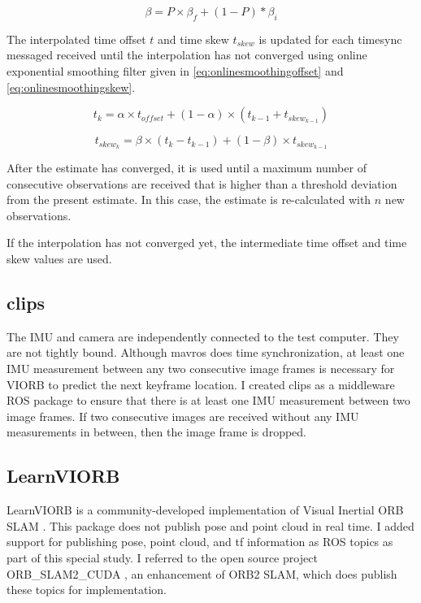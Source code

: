 \begin{equation} \label{eq:sigmoidbeta}
\beta = P \times \beta_f + (1 - P) * \beta_i
\end{equation}

The interpolated time offset $t$ and time skew $t_{skew}$ is updated for each timesync messaged received until the interpolation has not converged using online exponential smoothing filter given in \ref{eq:onlinesmoothingoffset} and \ref{eq:onlinesmoothingskew}.

\begin{equation} \label{eq:onlinesmoothingoffset}
t_{k} = \alpha \times t_{offset}  + (1 - \alpha) \times (t_{k-1} + t_{skew_{k-1}})
\end{equation}

\begin{equation} \label{eq:onlinesmoothingskew}
t_{skew_k} = \beta \times (t_k - t_{k-1}) + (1 - \beta) \times t_{skew_{k-1}} 
\end{equation}

After the estimate has converged, it is used until a maximum number of consecutive observations are received that is higher than a threshold deviation from the present estimate. In this case, the estimate is re-calculated with $n$ new observations.

If the interpolation has not converged yet, the intermediate time offset and time skew values are used.


\subsection{clips}
The IMU and camera are independently connected to the test computer. They are not tightly bound. Although mavros does time synchronization, at least one IMU measurement between any two consecutive image frames is necessary for VIORB to predict the next keyframe location. 
I created clips as a middleware ROS package to ensure that there is at least one IMU measurement between two image frames. If two consecutive images are received without any IMU measurements in between, then the image frame is dropped.

\subsection{LearnVIORB}
LearnVIORB is a community-developed implementation of Visual Inertial ORB SLAM . This package does not publish pose and point cloud in real time. I added support for publishing pose, point cloud, and tf information as ROS topics as part of this special study. 
I referred to the open source project ORB\_SLAM2\_CUDA \cite{orbcuda}, an enhancement of ORB2 SLAM, which does publish these topics for implementation.

